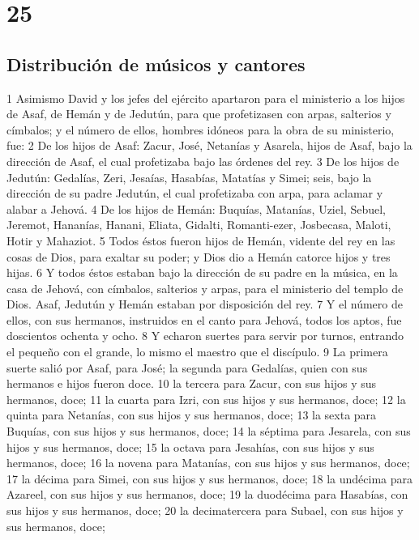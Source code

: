 \chapter{25}

\section*{Distribución de músicos y cantores}


1 Asimismo David y los jefes del ejército apartaron para el ministerio a los hijos de Asaf, de Hemán y de Jedutún, para que profetizasen con arpas, salterios y címbalos; y el número de ellos, hombres idóneos para la obra de su ministerio, fue:
2 De los hijos de Asaf: Zacur, José, Netanías y Asarela, hijos de Asaf, bajo la dirección de Asaf, el cual profetizaba bajo las órdenes del rey.
3 De los hijos de Jedutún: Gedalías, Zeri, Jesaías, Hasabías, Matatías y Simei; seis, bajo la dirección de su padre Jedutún, el cual profetizaba con arpa, para aclamar y alabar a Jehová.
4 De los hijos de Hemán: Buquías, Matanías, Uziel, Sebuel, Jeremot, Hananías, Hanani, Eliata, Gidalti, Romanti-ezer, Josbecasa, Maloti, Hotir y Mahaziot.
5 Todos éstos fueron hijos de Hemán, vidente del rey en las cosas de Dios, para exaltar su poder; y Dios dio a Hemán catorce hijos y tres hijas.
6 Y todos éstos estaban bajo la dirección de su padre en la música, en la casa de Jehová, con címbalos, salterios y arpas, para el ministerio del templo de Dios. Asaf, Jedutún y Hemán estaban por disposición del rey.
7 Y el número de ellos, con sus hermanos, instruidos en el canto para Jehová, todos los aptos, fue doscientos ochenta y ocho.
8 Y echaron suertes para servir por turnos, entrando el pequeño con el grande, lo mismo el maestro que el discípulo.
9 La primera suerte salió por Asaf, para José; la segunda para Gedalías, quien con sus hermanos e hijos fueron doce.
10 la tercera para Zacur, con sus hijos y sus hermanos, doce;
11 la cuarta para Izri, con sus hijos y sus hermanos, doce;
12 la quinta para Netanías, con sus hijos y sus hermanos, doce;
13 la sexta para Buquías, con sus hijos y sus hermanos, doce;
14 la séptima para Jesarela, con sus hijos y sus hermanos, doce;
15 la octava para Jesahías, con sus hijos y sus hermanos, doce;
16 la novena para Matanías, con sus hijos y sus hermanos, doce;
17 la décima para Simei, con sus hijos y sus hermanos, doce;
18 la undécima para Azareel, con sus hijos y sus hermanos, doce;
19 la duodécima para Hasabías, con sus hijos y sus hermanos, doce;
20 la decimatercera para Subael, con sus hijos y sus hermanos, doce;

